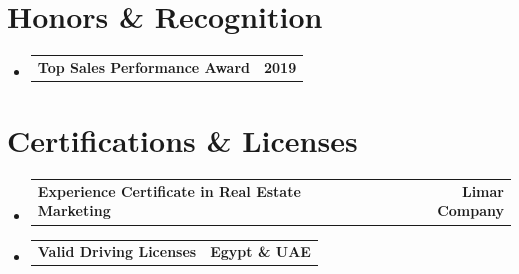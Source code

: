 \documentclass[letterpaper,11pt]{article}
\makeatletter
\newcommand{\resumeProjectHeading}[2]{
    \item
    \begin{tabular*}{1.001\textwidth}{l@{\extracolsep{\fill}}r}
      \small#1 & \textbf{\small #2}\\
    \end{tabular*}\vspace{-7pt}
}
\newcommand{\resumeSubHeadingListStart}{\begin{itemize}[leftmargin=0.0in, label={}]}
\newcommand{\resumeSubHeadingListEnd}{\end{itemize}}
\makeatother
\begin{document}
\section{Honors \& Recognition}
\resumeSubHeadingListStart
     \resumeProjectHeading
        {\textbf{Top Sales Performance Award}}{2019}
\resumeSubHeadingListEnd

\section{Certifications \& Licenses}
\resumeSubHeadingListStart
     \resumeProjectHeading
        {\textbf{Experience Certificate in Real Estate Marketing}}{Limar Company}
     \resumeProjectHeading
        {\textbf{Valid Driving Licenses}}{Egypt \& UAE}
\resumeSubHeadingListEnd
\end{document}
